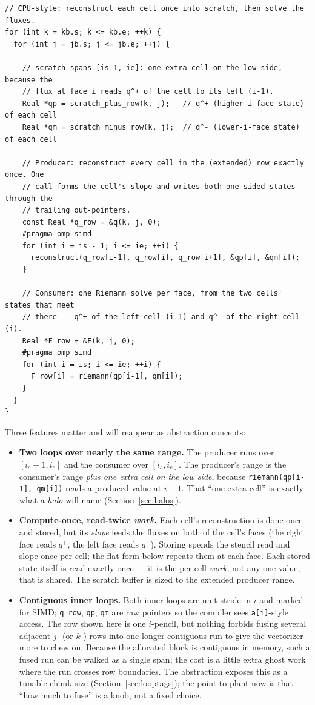 \documentclass[11pt]{article}
\newcommand{\code}[1]{\lstinline[basicstyle=\ttfamily]|#1|}
\begin{document}
\begin{lstlisting}
// CPU-style: reconstruct each cell once into scratch, then solve the fluxes.
for (int k = kb.s; k <= kb.e; ++k) {
  for (int j = jb.s; j <= jb.e; ++j) {

    // scratch spans [is-1, ie]: one extra cell on the low side, because the
    // flux at face i reads q^+ of the cell to its left (i-1).
    Real *qp = scratch_plus_row(k, j);   // q^+ (higher-i-face state) of each cell
    Real *qm = scratch_minus_row(k, j);  // q^- (lower-i-face state) of each cell

    // Producer: reconstruct every cell in the (extended) row exactly once. One
    // call forms the cell's slope and writes both one-sided states through the
    // trailing out-pointers.
    const Real *q_row = &q(k, j, 0);
    #pragma omp simd
    for (int i = is - 1; i <= ie; ++i) {
      reconstruct(q_row[i-1], q_row[i], q_row[i+1], &qp[i], &qm[i]);
    }

    // Consumer: one Riemann solve per face, from the two cells' states that meet
    // there -- q^+ of the left cell (i-1) and q^- of the right cell (i).
    Real *F_row = &F(k, j, 0);
    #pragma omp simd
    for (int i = is; i <= ie; ++i) {
      F_row[i] = riemann(qp[i-1], qm[i]);
    }
  }
}
\end{lstlisting}

Three features matter and will reappear as abstraction concepts:
\begin{itemize}
\item \textbf{Two loops over nearly the same range.} The producer runs over
  $[i_s-1, i_e]$ and the consumer over $[i_s, i_e]$. The producer's range is the
  consumer's range \emph{plus one extra cell on the low side}, because
  \code{riemann(qp[i-1], qm[i])} reads a produced value at $i-1$. That ``one
  extra cell'' is exactly what a \emph{halo} will name (Section~\ref{sec:halos}).
\item \textbf{Compute-once, read-twice \emph{work}.} Each cell's reconstruction is
  done once and stored, but its \emph{slope} feeds the fluxes on both of the cell's
  faces (the right face reads $q^+$, the left face reads $q^-$). Storing spends the
  stencil read and slope once per cell; the flat form below repeats them at each
  face. Each stored state itself is read exactly once --- it is the per-cell
  \emph{work}, not any one value, that is shared. The scratch buffer is sized to the
  extended producer range.
\item \textbf{Contiguous inner loops.} Both inner loops are unit-stride in $i$
  and marked for SIMD; \code{q_row}, \code{qp}, \code{qm} are raw pointers so the
  compiler sees \code{a[i]}-style access. The row shown here is one $i$-pencil, but
  nothing forbids fusing several adjacent $j$- (or $k$-) rows into one longer
  contiguous run to give the vectorizer more to chew on. Because the allocated
  block is contiguous in memory, such a fused run can be walked as a single span;
  the cost is a little extra ghost work where the run crosses row boundaries. The
  abstraction exposes this as a tunable chunk size (Section~\ref{sec:looptags});
  the point to plant now is that ``how much to fuse'' is a knob, not a fixed
  choice.
\end{itemize}
\end{document}
